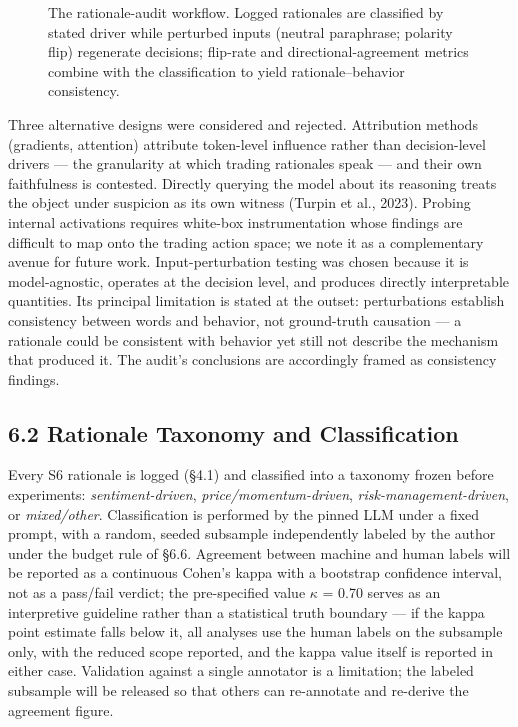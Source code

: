\documentclass[
  12pt,
]{article}
\begin{document}
\begin{figure}[htbp]
\centering
\resizebox{\linewidth}{!}{}
\caption{The rationale-audit workflow. Logged rationales are classified by stated driver while perturbed inputs (neutral paraphrase; polarity flip) regenerate decisions; flip-rate and directional-agreement metrics combine with the classification to yield rationale–behavior consistency.}
\label{fig:audit}
\end{figure}



Three alternative designs were considered and rejected. Attribution
methods (gradients, attention) attribute token-level influence rather
than decision-level drivers --- the granularity at which trading
rationales speak --- and their own faithfulness is contested. Directly
querying the model about its reasoning treats the object under suspicion
as its own witness (Turpin et al., 2023). Probing internal activations
requires white-box instrumentation whose findings are difficult to map
onto the trading action space; we note it as a complementary avenue for
future work. Input-perturbation testing was chosen because it is
model-agnostic, operates at the decision level, and produces directly
interpretable quantities. Its principal limitation is stated at the
outset: perturbations establish consistency between words and behavior,
not ground-truth causation --- a rationale could be consistent with
behavior yet still not describe the mechanism that produced it. The
audit's conclusions are accordingly framed as consistency findings.

\hypertarget{rationale-taxonomy-and-classification}{%
\subsection{6.2 Rationale Taxonomy and
Classification}\label{rationale-taxonomy-and-classification}}

Every S6 rationale is logged (§4.1) and classified into a taxonomy
frozen before experiments: \emph{sentiment-driven},
\emph{price/momentum-driven}, \emph{risk-management-driven}, or
\emph{mixed/other}. Classification is performed by the pinned LLM under
a fixed prompt, with a random, seeded subsample independently labeled by
the author under the budget rule of §6.6. Agreement between machine and
human labels will be reported as a continuous Cohen's kappa with a
bootstrap confidence interval, not as a pass/fail verdict; the
pre-specified value \(\kappa\) = 0.70 serves as an interpretive
guideline rather than a statistical truth boundary --- if the kappa
point estimate falls below it, all analyses use the human labels on the
subsample only, with the reduced scope reported, and the kappa value
itself is reported in either case. Validation against a single annotator
is a limitation; the labeled subsample will be released so that others
can re-annotate and re-derive the agreement figure. 
\end{document}
